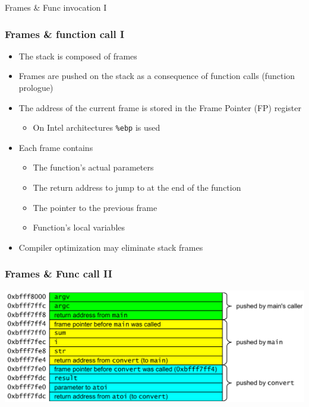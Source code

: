 \documentclass[12pt]{beamer}
\begin{document}
	\begin{frame}{Frames \& Func invocation I}
  		\frametitle{Frames \& function call I}
  		\begin{itemize}
  		\item The stack is composed of frames
  		\item Frames are pushed on the stack as a consequence of function calls (function prologue)
  		\item The address of the current frame is stored in the Frame Pointer (FP) register
  		\begin{itemize}
		\item On Intel architectures \texttt{\%ebp} is used
  		\end{itemize}
		\item Each frame contains
		\begin{itemize}
		\item The function’s actual parameters
		\item The return address to jump to at the end of the function
		\item The pointer to the previous frame
		\item Function’s local variables
		\end{itemize}
		\item Compiler optimization may eliminate stack frames
		\end{itemize}
	\end{frame}
	
 	\begin{frame}{}
 		\frametitle{Frames \& Func call II}
 		\small
		
		\includegraphics[scale=0.2]{images/stack2.png} 
 	\end{frame}
 	
\end{document}
